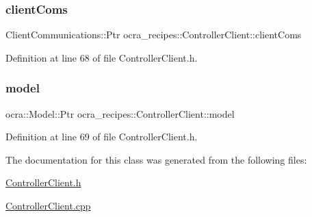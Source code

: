 \subsubsection{\texorpdfstring{client\+Coms}{clientComs}}
{\footnotesize\ttfamily Client\+Communications\+::\+Ptr ocra\+\_\+recipes\+::\+Controller\+Client\+::client\+Coms\hspace{0.3cm}{\ttfamily [protected]}}



Definition at line 68 of file Controller\+Client.\+h.

\hypertarget{classocra__recipes_1_1ControllerClient_a7eab32e91df97360c4de86f968a943e6}{}\label{classocra__recipes_1_1ControllerClient_a7eab32e91df97360c4de86f968a943e6} 
\subsubsection{\texorpdfstring{model}{model}}
{\footnotesize\ttfamily ocra\+::\+Model\+::\+Ptr ocra\+\_\+recipes\+::\+Controller\+Client\+::model\hspace{0.3cm}{\ttfamily [protected]}}



Definition at line 69 of file Controller\+Client.\+h.



The documentation for this class was generated from the following files\+:\begin{DoxyCompactItemize}
\item 
\hyperlink{ControllerClient_8h}{Controller\+Client.\+h}\item 
\hyperlink{ControllerClient_8cpp}{Controller\+Client.\+cpp}\end{DoxyCompactItemize}
